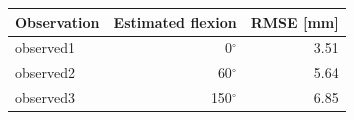\begin{tabular}{lrr}
\toprule
Observation & Estimated flexion & RMSE [mm] \\
\midrule
observed1 & 0$^\circ$ & 3.51 \\
observed2 & 60$^\circ$ & 5.64 \\
observed3 & 150$^\circ$ & 6.85 \\
\bottomrule
\end{tabular}